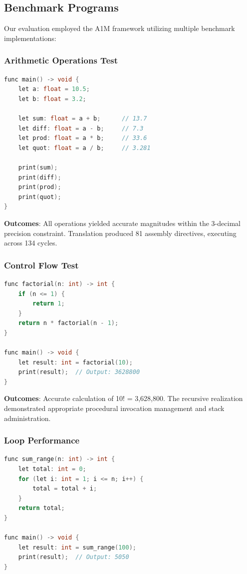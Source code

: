 \documentclass[conference,10pt,twocolumn]{IEEEtran}
\begin{document}
\subsection{Benchmark Programs}

Our evaluation employed the A1M framework utilizing multiple benchmark implementations:

\subsubsection{Arithmetic Operations Test}

\begin{lstlisting}[language=C, basicstyle=\small\ttfamily]
func main() -> void {
    let a: float = 10.5;
    let b: float = 3.2;
    
    let sum: float = a + b;      // 13.7
    let diff: float = a - b;     // 7.3
    let prod: float = a * b;     // 33.6
    let quot: float = a / b;     // 3.281
    
    print(sum);
    print(diff);
    print(prod);
    print(quot);
}
\end{lstlisting}

\textbf{Outcomes}: All operations yielded accurate magnitudes within the 3-decimal precision constraint. Translation produced 81 assembly directives, executing across 134 cycles.

\subsubsection{Control Flow Test}

\begin{lstlisting}[language=C, basicstyle=\small\ttfamily]
func factorial(n: int) -> int {
    if (n <= 1) {
        return 1;
    }
    return n * factorial(n - 1);
}

func main() -> void {
    let result: int = factorial(10);
    print(result);  // Output: 3628800
}
\end{lstlisting}

\textbf{Outcomes}: Accurate calculation of 10! = 3,628,800. The recursive realization demonstrated appropriate procedural invocation management and stack administration.

\subsubsection{Loop Performance}

\begin{lstlisting}[language=C, basicstyle=\small\ttfamily]
func sum_range(n: int) -> int {
    let total: int = 0;
    for (let i: int = 1; i <= n; i++) {
        total = total + i;
    }
    return total;
}

func main() -> void {
    let result: int = sum_range(100);
    print(result);  // Output: 5050
}
\end{lstlisting}
\end{document}
